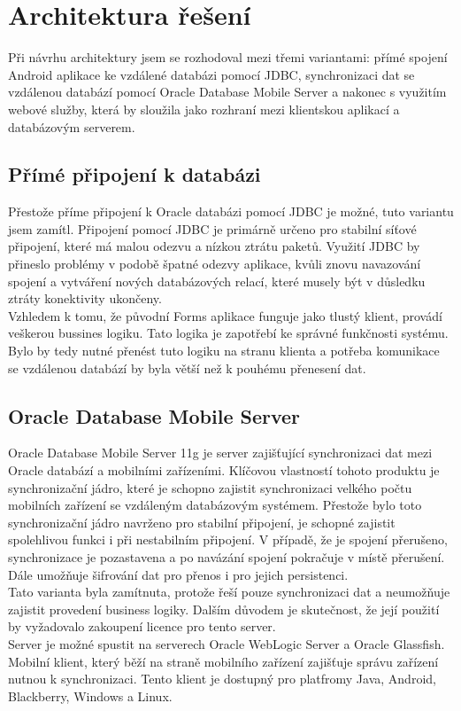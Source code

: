 \documentclass{diplomka}
\begin{document}
\section{Architektura řešení}
\label{sec:architecture}
Při návrhu architektury jsem se rozhodoval mezi třemi variantami: přímé spojení Android aplikace ke vzdálené databázi pomocí JDBC, synchronizaci dat se vzdálenou databází pomocí Oracle Database Mobile Server a nakonec s využitím webové služby, která by sloužila jako rozhraní mezi klientskou aplikací a databázovým serverem.

\subsection{Přímé připojení k databázi}
Přestože příme připojení k Oracle databázi pomocí JDBC je možné, tuto variantu jsem zamítl. Připojení pomocí JDBC je primárně určeno pro stabilní síťové připojení, které má malou odezvu a nízkou ztrátu paketů. Využití JDBC by přineslo problémy v podobě špatné odezvy aplikace, kvůli znovu navazování spojení a vytváření nových databázových relací, které musely být v důsledku ztráty konektivity ukončeny.\\ \indent
Vzhledem k tomu, že původní Forms aplikace funguje jako tlustý klient, provádí veškerou bussines logiku. Tato logika je zapotřebí ke správné funkčnosti systému. Bylo by tedy nutné přenést tuto logiku na stranu klienta a potřeba komunikace se vzdálenou databází by byla větší než k pouhému přenesení dat.

\subsection{Oracle Database Mobile Server}
Oracle Database Mobile Server 11g\cite{mobile} je server zajišťující  synchronizaci dat mezi Oracle databází a mobilními zařízeními. Klíčovou vlastností tohoto produktu je synchronizační jádro, které je schopno zajistit synchronizaci velkého počtu mobilních zařízení se vzdáleným databázovým systémem. Přestože bylo toto synchronizační jádro navrženo pro stabilní připojení, je schopné zajistit spolehlivou funkci i při nestabilním připojení. V případě, že je spojení přerušeno, synchronizace je pozastavena a po navázání spojení pokračuje v místě přerušení. Dále umožňuje šifrování dat pro přenos i pro jejich persistenci.\\ \indent
Tato varianta byla zamítnuta, protože řeší pouze synchronizaci dat a neumožňuje zajistit provedení business logiky. Dalším důvodem je skutečnost, že její použití by vyžadovalo zakoupení licence pro tento server.\\ \indent
Server je možné spustit na serverech Oracle WebLogic Server a Oracle Glassfish. Mobilní klient, který běží na straně mobilního zařízení zajišťuje správu zařízení nutnou k synchronizaci. Tento klient je dostupný pro platfromy Java, Android, Blackberry, Windows a Linux.
\end{document}
